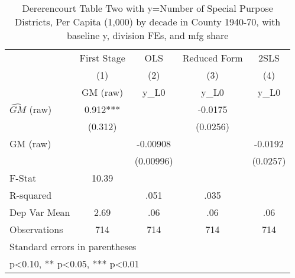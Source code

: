 \begin{table}[htbp]\centering
\def\sym#1{\ifmmode^{#1}\else\(^{#1}\)\fi}
\caption{Dererencourt Table Two with y=Number of Special Purpose Districts, Per Capita (1,000) by decade in County 1940-70, with baseline y, division FEs, and mfg share}
\begin{tabular}{l*{4}{c}}
\toprule
                    & First Stage   &         OLS   &Reduced Form   &        2SLS   \\
                    &\multicolumn{1}{c}{(1)}&\multicolumn{1}{c}{(2)}&\multicolumn{1}{c}{(3)}&\multicolumn{1}{c}{(4)}\\
                    &\multicolumn{1}{c}{GM  (raw)}&\multicolumn{1}{c}{y\_L0}&\multicolumn{1}{c}{y\_L0}&\multicolumn{1}{c}{y\_L0}\\
\midrule
$\hat{GM}$ (raw)    &       0.912***&               &     -0.0175   &               \\
                    &     (0.312)   &               &    (0.0256)   &               \\
\addlinespace
GM  (raw)           &               &    -0.00908   &               &     -0.0192   \\
                    &               &   (0.00996)   &               &    (0.0257)   \\
\midrule
F-Stat              &       10.39   &               &               &               \\
R-squared           &               &        .051   &        .035   &               \\
Dep Var Mean        &        2.69   &         .06   &         .06   &         .06   \\
Observations        &         714   &         714   &         714   &         714   \\
\bottomrule
\multicolumn{5}{l}{\footnotesize Standard errors in parentheses}\\
\multicolumn{5}{l}{\footnotesize * p<0.10, ** p<0.05, *** p<0.01}\\
\end{tabular}
\end{table}
